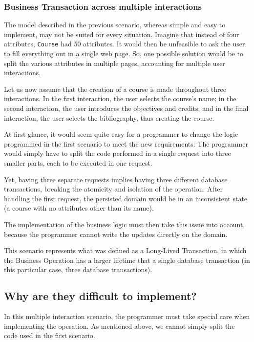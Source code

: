 \documentclass{llncs}
\begin{document}
\subsubsection{Business Transaction across multiple interactions}

The model described in the previous scenario, whereas simple and easy
to implement, may not be suited for every situation. Imagine that
instead of four attributes, \texttt{Course} had 50 attributes. It
would then be unfeasible to ask the user to fill everything out in a
single web page. So, one possible solution would be to split the
various attributes in multiple pages, accounting for multiple user
interactions.

Let us now assume that the creation of a course is made throughout
three interactions. In the first interaction, the user selects the
course's name; in the second interaction, the user introduces the
objectives and credits; and in the final interaction, the user selects
the bibliography, thus creating the course.

At first glance, it would seem quite easy for a programmer to change
the logic programmed in the first scenario to meet the new
requirements: The programmer would simply have to split the code
performed in a single request into three smaller parts, each to be
executed in one request.

Yet, having three separate requests implies having three different
database transactions, breaking the atomicity and isolation of the
operation. After handling the first request, the persisted domain
would be in an inconsistent state (a course with no attributes other
than its name).

The implementation of the business logic must then take this issue
into account, because the programmer cannot write the updates directly
on the domain.

This scenario represents what was defined as a Long-Lived Transaction,
in which the Business Operation has a larger lifetime that a single
database transaction (in this particular case, three database
transactions).

\subsection{Why are they difficult to implement?}
\label{sec:difficult}

In this multiple interaction scenario, the programmer must take
special care when implementing the operation. As mentioned above, we
cannot simply split the code used in the first scenario.
\end{document}
